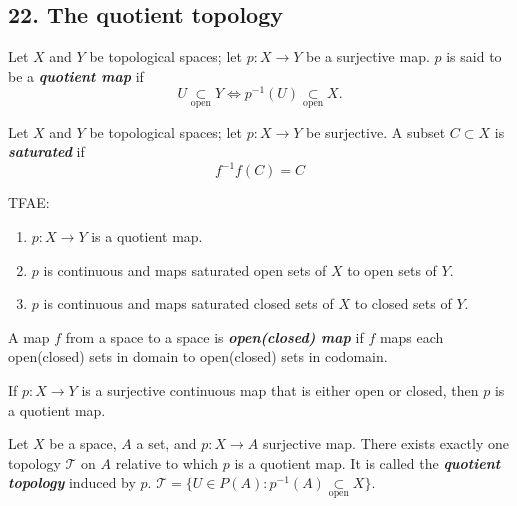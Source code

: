 \subsection{22. The quotient topology}
\begin{mydefinition}
Let $X$ and $Y$ be topological spaces; let $p:X\to Y$ be a surjective map. $p$ is said to be a \textbf{\emph{quotient map}} if
$$U\underset{\text{open}}{\subset}Y \iff p^{-1}(U)\underset{\text{open}}{\subset}X.$$
\end{mydefinition}

\begin{mydefinition}
Let $X$ and $Y$ be topological spaces; let $p:X\to Y$ be surjective. A subset $C\subset X$ is \textbf{\emph{saturated}} if
$$f^{-1}f(C)=C$$
\end{mydefinition}

\begin{myproposition}
TFAE:
\begin{enumerate}[label={(\alph*)}]
\item $p:X\to Y$ is a quotient map.
\item $p$ is continuous and maps saturated open sets of $X$ to open sets of $Y$.
\item $p$ is continuous and maps saturated closed sets of $X$ to closed sets of $Y$.
\end{enumerate}    
\end{myproposition}

\begin{mydefinition}
A map $f$ from a space to a space is \textbf{\emph{open(closed) map}} if $f$ maps each open(closed) sets in domain to open(closed) sets in codomain.
\end{mydefinition}

\begin{myproposition}
If $p:X\to Y$ is a surjective continuous map that is either open or closed, then $p$ is a quotient map.
\end{myproposition}

\begin{mydefinition}
Let $X$ be a space, $A$ a set, and $p:X\to A$ surjective map. There exists exactly one topology $\mathcal{T}$ on $A$ relative to which $p$ is a quotient map. It is called the \textbf{\emph{quotient topology}} induced by $p$. $\mathcal{T}=\{U\in P(A):p^{-1}(A)\underset{\text{open}}{\subset}X\}$.
\end{mydefinition}

